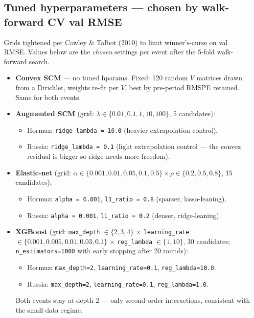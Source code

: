 \documentclass[11pt,a4paper]{article}
\begin{document}
\subsection{Tuned hyperparameters --- chosen by walk-forward CV val RMSE}

Grids tightened per Cawley \& Talbot (2010) to limit winner's-curse on val RMSE. Values below are the \emph{chosen} settings per event after the 5-fold walk-forward search.

\begin{itemize}
  \item \textbf{Convex SCM} --- no tuned hparams. Fixed: 120 random $V$ matrices drawn from a Dirichlet, weights re-fit per $V$, best by pre-period RMSPE retained. Same for both events.
  \item \textbf{Augmented SCM} (grid: $\lambda \in \{0.01, 0.1, 1, 10, 100\}$, 5 candidates):
  \begin{itemize}
    \item Hormuz: \texttt{ridge\_lambda = 10.0} (heavier extrapolation control).
    \item Russia:  \texttt{ridge\_lambda = 0.1} (light extrapolation control --- the convex residual is bigger so ridge needs more freedom).
  \end{itemize}
  \item \textbf{Elastic-net} (grid: $\alpha \in \{0.001, 0.01, 0.05, 0.1, 0.5\} \times \rho \in \{0.2, 0.5, 0.8\}$, 15 candidates):
  \begin{itemize}
    \item Hormuz: \texttt{alpha = 0.001}, \texttt{l1\_ratio = 0.8} (sparser, lasso-leaning).
    \item Russia:  \texttt{alpha = 0.001}, \texttt{l1\_ratio = 0.2} (denser, ridge-leaning).
  \end{itemize}
  \item \textbf{XGBoost} (grid: \texttt{max\_depth} $\in \{2,3,4\}$ $\times$ \texttt{learning\_rate} $\in \{0.001, 0.005, 0.01, 0.03, 0.1\}$ $\times$ \texttt{reg\_lambda} $\in \{1, 10\}$, 30 candidates; \texttt{n\_estimators=1000} with early stopping after 20 rounds):
  \begin{itemize}
    \item Hormuz: \texttt{max\_depth=2}, \texttt{learning\_rate=0.1}, \texttt{reg\_lambda=10.0}.
    \item Russia:  \texttt{max\_depth=2}, \texttt{learning\_rate=0.1}, \texttt{reg\_lambda=1.0}.
  \end{itemize}
  Both events stay at depth 2 --- only second-order interactions, consistent with the small-data regime.

\end{itemize}
\end{document}
